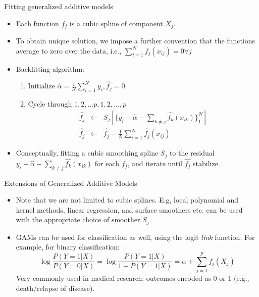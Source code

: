 \documentclass{beamer}
\begin{document}
\begin{frame}{Fitting generalized additive models}
    \begin{itemize}
        \item Each function $f_j$ is a cubic spline of component $X_j$.
        \item To obtain unique solution, we impose a further convention that the functions average to zero over the data, i.e., $\sum_{i=1}^N f_j(x_{ij}) = 0 \forall j$
        \item Backfitting algorithm:
        \begin{enumerate}
            \item Initialize $\hat{\alpha} = \frac{1}{N} \sum_{i=1}^N y_i, \hat{f_j} = 0$.
            \item Cycle through $1, 2, ... p, 1, 2, ..., p$
            \begin{eqnarray*}
                \hat{f_j} & \longleftarrow & S_j\left[ \{y_i - \hat{\alpha} - \sum_{k\neq j} \hat{f_k}(x_{ik})\}_1^N \right]\\
                \hat{f_j} &\longleftarrow & \hat{f_j} - \frac{1}{N} \sum_{i=1}^N \hat{f_j}(x_{ij})
            \end{eqnarray*}
        \end{enumerate}
        \item Conceptually, fitting a cubic smoothing spline $S_j$ to the residual $y_i - \hat{\alpha} - \sum_{k\neq j} \hat{f_k}(x_{ik})$ for each $f_j$, and iterate until $\hat{f_j}$ stabilize.  
    \end{itemize}
\end{frame}


\begin{frame}{Extensions of Generalized Additive Models}
    \begin{itemize}
        \item Note that we are not limited to cubic splines. E.g, local polynomial and kernel methods, linear regression, and surface smoothers etc. can be used with the appropriate choice of smoother $S_j$.
        \item GAMs can be used for classification as well, using the logit \textit{link} function. For example, for binary classification:
        \begin{equation*}
            \log{\frac{P(Y=1|X)}{P(Y=0|X)}} = \log{\frac{P(Y=1|X)}{1-P(Y=1|X)}} =  \alpha + \sum_{j=1}^p f_j(X_j)
        \end{equation*}
        Very commonly used in medical research: outcomes encoded as 0 or 1 (e.g., death/relapse of disease).
    \end{itemize}
\end{frame}
\end{document}
